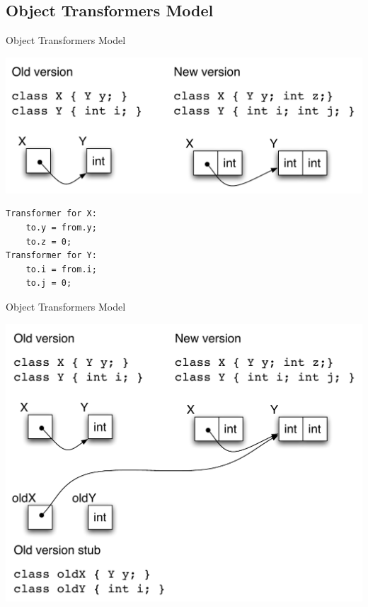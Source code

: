 \subsection{Object Transformers Model}

\begin{frame}[t,fragile]{Object Transformers Model}%
\begin{center}
\includegraphics[scale=0.5]{images/object-transformers-model-example}
\end{center}
\begin{center}
\begin{minipage}{0.4\textwidth}
\begin{lstlisting}[frame=single]
Transformer for X:
    to.y = from.y;
    to.z = 0;
Transformer for Y:
    to.i = from.i;
    to.j = 0;
\end{lstlisting}
\end{minipage}
\end{center}
\end{frame}

\begin{frame}[t,fragile]{Object Transformers Model}%
\begin{center}
\includegraphics[scale=0.5]{images/object-transformers-model-example-1}
\end{center}
\end{frame}


